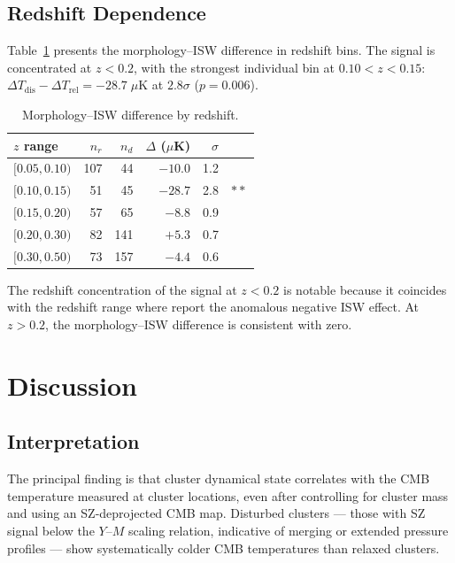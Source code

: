 \documentclass[twocolumn]{article}
\begin{document}
\subsection{Redshift Dependence}

Table~\ref{tab:zbins} presents the morphology--ISW difference in
redshift bins.
The signal is concentrated at $z < 0.2$, with the strongest
individual bin at $0.10 < z < 0.15$: $\Delta T_{\mathrm{dis}} -
\Delta T_{\mathrm{rel}} = -28.7\;\mu$K at $2.8\sigma$ ($p = 0.006$).

\begin{table}[h]
\centering
\caption{Morphology--ISW difference by redshift.}
\label{tab:zbins}
\begin{tabular}{lrrrrl}
\toprule
$z$ range & $n_r$ & $n_d$ & $\Delta$ ($\mu$K) & $\sigma$ & \\
\midrule
$[0.05, 0.10)$ & 107 & 44 & $-10.0$ & 1.2 & \\
$[0.10, 0.15)$ & 51 & 45 & $-28.7$ & 2.8 & $**$ \\
$[0.15, 0.20)$ & 57 & 65 & $-8.8$ & 0.9 & \\
$[0.20, 0.30)$ & 82 & 141 & $+5.3$ & 0.7 & \\
$[0.30, 0.50)$ & 73 & 157 & $-4.4$ & 0.6 & \\
\bottomrule
\end{tabular}
\end{table}

The redshift concentration of the signal at $z < 0.2$ is notable
because it coincides with the redshift range where
\citet{hansen2026} report the anomalous negative ISW effect.
At $z > 0.2$, the morphology--ISW difference is consistent with
zero.

\section{Discussion}
\label{sec:discussion}

\subsection{Interpretation}

The principal finding is that cluster dynamical state correlates
with the CMB temperature measured at cluster locations, even after
controlling for cluster mass and using an SZ-deprojected CMB map.
Disturbed clusters --- those with SZ signal below the $Y$--$M$
scaling relation, indicative of merging or extended pressure
profiles --- show systematically colder CMB temperatures than
relaxed clusters.
\end{document}
